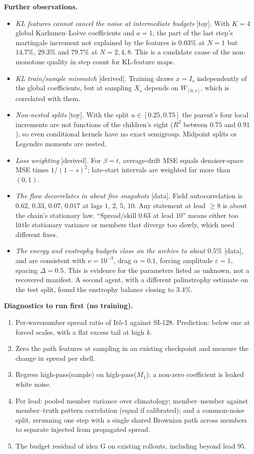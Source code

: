 \documentclass[11pt,a4paper]{article}
\newcommand{\status}[1]{\textsf{\small\color{black!60}[#1]}}
\newcommand{\head}[1]{\par\smallskip\noindent\textbf{#1}\ }
\begin{document}
\head{Further observations.}
\begin{itemize}
\item \emph{KL features cannot cancel the noise at intermediate budgets} \status{toy}. With $K=4$ global Karhunen--Lo\`eve coefficients and $a=1$, the part of the last step's martingale increment not explained by the features is $0.03\%$ at $N=1$ but $14.7\%$, $29.3\%$ and $79.7\%$ at $N=2,4,8$. This is a candidate cause of the non-monotone quality in step count for KL-feature maps.
\item \emph{KL train/sample mismatch} \status{derived}. Training draws $x=I_s$ independently of the global coefficients, but at sampling $X_s$ depends on $W_{[0,s]}$, which is correlated with them.
\item \emph{Non-nested splits} \status{toy}. With the split $u\in[0.25,0.75]$ the parent's four local increments are not functions of the children's eight ($R^2$ between $0.75$ and $0.91$), so even conditional kernels have no exact semigroup. Midpoint splits or Legendre moments are nested.
\item \emph{Loss weighting} \status{derived}. For $\beta=t$, average-drift MSE equals denoiser-space MSE times $1/(1-s)^2$; late-start intervals are weighted far more than $(0,1)$.
\item \emph{The flow decorrelates in about five snapshots} \status{data}. Field autocorrelation is $0.62$, $0.33$, $0.07$, $0.017$ at lags $1$, $2$, $5$, $10$. Any statement at lead $\geq8$ is about the chain's stationary law. ``Spread/skill $0.63$ at lead 10'' means either too little stationary variance or members that diverge too slowly, which need different fixes.
\item \emph{The energy and enstrophy budgets close on the archive to about $0.5\%$} \status{data}, and are consistent with $\nu=10^{-3}$, drag $\alpha=0.1$, forcing amplitude $\varepsilon=1$, spacing $\Delta=0.5$. This is evidence for the parameters listed as unknown, not a recovered manifest. A second agent, with a different palinstrophy estimate on the test split, found the enstrophy balance closing to $3.4\%$.
\end{itemize}

\head{Diagnostics to run first (no training).}
\begin{enumerate}
\item Per-wavenumber spread ratio of It\^o-1 against SI-128. Prediction: below one at forced scales, with a flat excess tail at high $k$.
\item Zero the path features at sampling in an existing checkpoint and measure the change in spread per shell.
\item Regress high-pass(sample) on high-pass($M_1$): a non-zero coefficient is leaked white noise.
\item Per lead: pooled member variance over climatology; member--member against member--truth pattern correlation (equal if calibrated); and a common-noise split, rerunning one step with a single shared Brownian path across members to separate injected from propagated spread.
\item The budget residual of idea G on existing rollouts, including beyond lead 95.
\end{enumerate}
\end{document}
